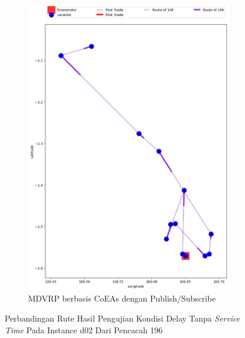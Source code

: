 \begin{figure}[H]\ContinuedFloat
	\centering
	\begin{subfigure}[t]{\textwidth}
		\centering
		\includegraphics[width=\textwidth]{Resources/Images/delayed_2/real_m15_n100_delayed_2_196_pubsub_coes}
		\caption{MDVRP berbasis CoEAs dengan Publish/Subscribe}
		\label{fig:real_m15_n100_delayed_2_196_pubsub_coes}
	\end{subfigure}
	\caption{Perbandingan Rute Hasil Pengujian Kondisi Delay Tanpa \textit{Service Time} Pada Instance d02 Dari Pencacah 196}
	\label{fig:real_m15_n100_delayed_2_196_contd}
\end{figure}



